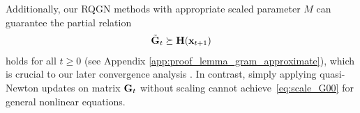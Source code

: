 \documentclass[11pt]{article}
\theoremstyle{plain}
\theoremstyle{definition}
\theoremstyle{remark}
\theoremstyle{plain}
\def\mG {{\bf G}}
\def\G{{\bf G}}
\def\H{{\bf H}}
\def\x{{\bf x}}
\begin{document}
Additionally, our RQGN methods with appropriate scaled parameter $M$ can guarantee the partial relation 
\begin{align}
\label{eq:scale_G00}
    {\tilde \G}_t \succeq \H(\x_{t+1})
\end{align}
holds for all $t\geq 0$ (see Appendix \ref{app:proof_lemma_gram_approximate}), which is crucial to our later convergence analysis .
In contrast, simply applying quasi-Newton updates on matrix $\mG_t$ without scaling cannot achieve~\eqref{eq:scale_G00} for general nonlinear equations.





\end{document}
